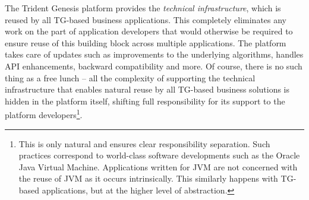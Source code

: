  The Trident Genesis platform provides the \emph{technical infrastructure}, which is reused by all TG-based business applications.
  This completely eliminates any work on the part of application developers that would otherwise be required to ensure reuse of this building block across multiple applications.
  The platform takes care of updates such as improvements to the underlying algorithms, handles API enhancements, backward compatibility and more.
  Of course, there is no such thing as a free lunch -- all the complexity of supporting the technical infrastructure that enables natural reuse by all TG-based business solutions is hidden in the platform itself, shifting full responsibility for its support to the platform developers\footnote{This is only natural and ensures clear responsibility separation. Such practices correspond to world-class software developments such as the Oracle Java Virtual Machine. 
  Applications written for JVM are not concerned with the reuse of JVM as it occurs intrinsically. This similarly happens with TG-based applications, but at the higher level of abstraction.}.

